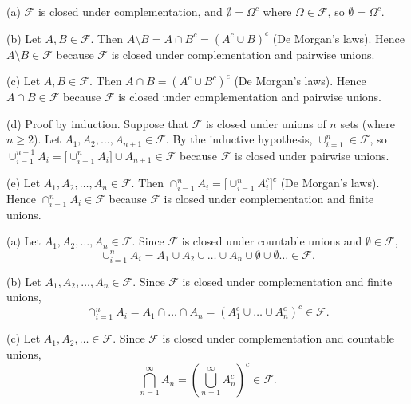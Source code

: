 \begin{Answer}{(a)}
$\mathcal{F}$ is closed under complementation, and $\emptyset = \Omega^c$ where $\Omega\in\mathcal{F}$, so $\emptyset = \Omega^c$.
\end{Answer}
\begin{Answer}{(b)}
Let $A,B\in\mathcal{F}$. Then $A\setminus B = A\cap B^c = (A^c\cup B)^c$ (De Morgan's laws). Hence $A\setminus B\in\mathcal{F}$ because $\mathcal{F}$ is closed under complementation and pairwise unions.
\end{Answer}
\begin{Answer}{(c)}
Let $A,B\in\mathcal{F}$. Then $A\cap B = (A^c\cup B^c)^c$ (De Morgan's laws). Hence $A\cap B\in\mathcal{F}$ because $\mathcal{F}$ is closed under complementation and pairwise unions.
\end{Answer}
\begin{Answer}{(d)}
Proof by induction. Suppose that $\mathcal{F}$ is closed under unions of $n$ sets (where $n\geq 2$). Let $A_1,A_2,\ldots,A_{n+1}\in\mathcal{F}$. By the inductive hypothesis, $\cup_{i=1}^n\in\mathcal{F}$, so $\cup_{i=1}^{n+1} A_i = \big[\cup_{i=1}^{n} A_i\big] \cup A_{n+1} \in\mathcal{F}$ because $\mathcal{F}$ is closed under pairwise unions.
\end{Answer}
\begin{Answer}{(e)}
Let $A_1,A_2,\ldots,A_n\in\mathcal{F}$. Then $\cap_{i=1}^n A_i = \big[\cup_{i=1}^n A_i^c\big]^c$ (De Morgan's laws). Hence $\cap_{i=1}^n A_i\in\mathcal{F}$ because $\mathcal{F}$ is closed under complementation and finite unions.
\end{Answer}
\begin{Answer}{(a)}
Let $A_1,A_2,\ldots,A_n\in\mathcal{F}$. Since $\mathcal{F}$ is closed under countable unions and $\emptyset\in\mathcal{F}$,
\[
\cup_{i=1}^n A_i = A_1\cup A_2\cup\ldots\cup A_n\cup\emptyset\cup\emptyset\ldots \in\mathcal{F}.
\]
\end{Answer}
\begin{Answer}{(b)}
Let $A_1,A_2,\ldots,A_n\in\mathcal{F}$. Since $\mathcal{F}$ is closed under complementation and finite unions,
\[
\cap_{i=1}^n A_i = A_1\cap\ldots\cap A_n = (A^c_1\cup\ldots\cup A^c_n)^c \in\mathcal{F}.
\]
\end{Answer}
\begin{Answer}{(c)}
Let $A_1,A_2,\ldots\in\mathcal{F}$. Since $\mathcal{F}$ is closed under complementation and countable unions,
\[
\bigcap_{n=1}^{\infty} A_n = \left(\bigcup_{n=1}^{\infty} A^c_n\right)^c \in\mathcal{F}.
\]
\end{Answer}
